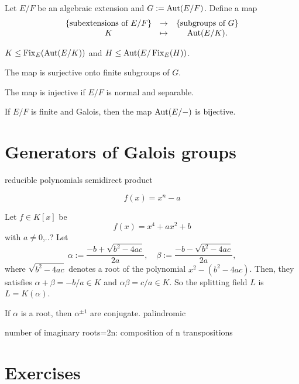 \documentclass{../../large}
\begin{document}
\begin{prb}
Let $E/F$ be an algebraic extension and $G:=\operatorname{Aut}(E/F)$.
Define a map
\[\begin{array}{ccc}
\{\text{subextensions of $E/F$}\}
&\to&
\{\text{subgroups of $G$}\}\\
K&\mapsto&\operatorname{Aut}(E/K).
\end{array}\]
\begin{parts}
\item $K\le \operatorname{Fix}_E(\operatorname{Aut}(E/K))$ and $H\le\operatorname{Aut}(E/\operatorname{Fix}_E(H))$.
\item The map is surjective onto finite subgroups of $G$.
\item The map is injective if $E/F$ is normal and separable.
\item If $E/F$ is finite and Galois, then the map $\operatorname{Aut}(E/-)$ is bijective.
\end{parts}
\end{prb}


\section{Generators of Galois groups}


reducible polynomials
semidirect product


\begin{prb}
\[f(x)=x^n-a\]
\end{prb}

\begin{prb}
Let $f\in K[x]$ be
\[f(x)=x^4+ax^2+b\]
with $a\ne0$,..?
Let
\[\alpha:=\frac{-b+\sqrt{b^2-4ac}}{2a},\quad\beta:=\frac{-b-\sqrt{b^2-4ac}}{2a},\]
where $\sqrt{b^2-4ac}$ denotes a root of the polynomial $x^2-(b^2-4ac)$.
Then, they satisfies $\alpha+\beta=-b/a\in K$ and $\alpha\beta=c/a\in K$.
So the splitting field $L$ is $L=K(\alpha)$.
\end{prb}

\begin{prb}
If $\alpha$ is a root, then $\alpha^{\pm1}$ are conjugate.
palindromic
\end{prb}

\begin{prb}
number of imaginary roots=2n: composition of n transpositions
\end{prb}




\section*{Exercises}
\end{document}
